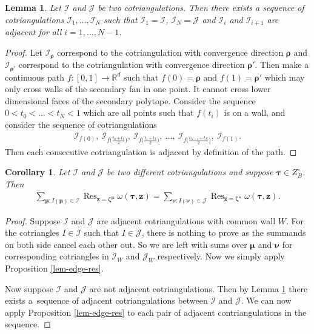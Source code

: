 \documentclass[11pt]{article}
\numberwithin{equation}{section}
\DeclareMathOperator*{\Res}{Res}
\numberwithin{equation}{section}
\newtheorem{Corollary}[Theorem]{Corollary}
\newtheorem{Lemma}[Theorem]{Lemma}
\begin{document}
\begin{Lemma}\label{lem-adj-conn}
Let $\mathcal{I}$ and $\mathcal{J}$ be two cotriangulations. Then there exists a sequence of cotriangulations $\mathcal{I}_1,\dots,\mathcal{I}_N$ such that $\mathcal{I}_1 = \mathcal{I}$, $\mathcal{I}_N = \mathcal{J}$ and $\mathcal{I}_{i}$ and $\mathcal{I}_{i+1}$ are adjacent for all $i=1,\dots,N-1$.
\end{Lemma}

\begin{proof}
Let $\mathcal{I}_{\bm\rho}$ correspond to the cotriangulation with convergence direction $\bm\rho$ and $\mathcal{I}_{\bm\rho'}$ correspond to the cotriangulation with convergence direction $\bm\rho'$. Then make a continuous path $f\colon [0,1] \rightarrow \mathbb{R}^d$ such that $f(0) = \bm\rho$ and $f(1) = \bm\rho'$ which may only cross walls of the secondary fan in one point. It cannot cross lower dimensional faces of the secondary polytope. Consider the sequence $0 < t_0 < \dots < t_N < 1$ which are all points such that $f(t_i)$ is on a wall, and consider the sequence of cotriangulations
\begin{gather*}
\mathcal{I}_{f(0)},\ \mathcal{I}_{f\big(\frac{t_{0} + t_{1}}{2}\big)},\
\mathcal{I}_{f\big(\frac{t_{1} + t_{2}}{2}\big)},\ \dots,\
\mathcal{I}_{f\big(\frac{t_{N-1} + t_{N}}{2}\big)},\ \mathcal{I}_{f(1)}.
\end{gather*}
Then each consecutive cotriangulation is adjacent by definition of the path.
\end{proof}

\begin{Corollary}\label{cor-gen-tri}
Let $\mathcal{I}$ and $\mathcal{J}$ be two different cotriangulations
and suppose $\bm\tau\in Z_B^\circ$.
Then
\begin{gather*}
\sum_{\bm{\mu}\colon I(\bm{\mu})\in\mathcal{I}}\Res_{\bm{z}=\bm\zeta^{\bm\mu}}\omega(\bm{\tau},\bm{z})
=\sum_{\bm{\nu}\colon I(\bm{\nu})\in\mathcal{J}}\Res_{\bm{z}=\bm\zeta^{\bm\nu}}\omega(\bm{\tau},\bm{z}).
\end{gather*}
\end{Corollary}

\begin{proof}
Suppose $\mathcal{I}$ and $\mathcal{J}$ are adjacent cotriangulations with common wall $W$.
For the cotriangles $I \in \mathcal{I}$ such that $I \in \mathcal{J}$, there is nothing to prove as the summands on both side cancel each other out. So we are left with sums over $\bm{\mu}$ and $\bm\nu$ for corresponding cotriangles in $\mathcal{I}_W$ and $\mathcal{J}_W$ respectively. Now we simply apply Proposition \ref{lem-edge-res}.

Now suppose $\mathcal{I}$ and $\mathcal{J}$ are not adjacent cotriangulations. Then by Lemma \ref{lem-adj-conn} there exists a~sequence of adjacent cotriangulations between $\mathcal{I}$ and $\mathcal{J}$. We can now apply Proposition \ref{lem-edge-res} to each pair of adjacent contriangulations in the sequence.
\end{proof}
\end{document}
